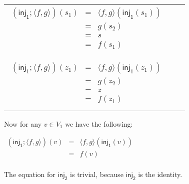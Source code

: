 \begin{center}
  \begin{tabular}{lll}
    \begin{math}
    \begin{array}{lll}
      (\mathsf{inj_1};\langle f , g \rangle)(s_1)
      & = & \langle f , g \rangle(\mathsf{inj_1}(s_1))\\
      & = & g(s_2)\\     
      & = & s \\
      & = & f(s_1)\\
    \end{array}
    \end{math}
    \\\\
    \begin{math}
    \begin{array}{lll}
      (\mathsf{inj_1};\langle f , g \rangle)(z_1)
      & = & \langle f , g \rangle(\mathsf{inj_1}(z_1))\\
      & = & g(z_2)\\     
      & = & z\\
      & = & f(z_1)\\
    \end{array}
  \end{math}
  \end{tabular}
\end{center}
Now for any $v \in V_1$ we have the following:
\begin{center}
  \begin{math}
    \begin{array}{lll}
      (\mathsf{inj_1};\langle f , g \rangle)(v)
      & = & \langle f , g \rangle(\mathsf{inj_1}(v))\\
      & = & f(v)\\
    \end{array}
  \end{math}
\end{center}
The equation for $\mathsf{inj_2}$ is trivial, because $\mathsf{inj_2}$
is the identity. 
